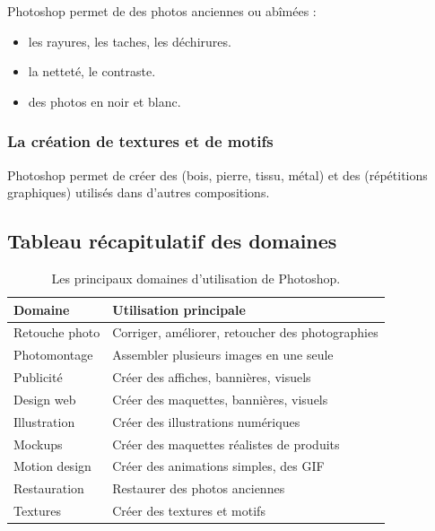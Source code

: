 Photoshop permet de  des photos anciennes ou abîmées :

\begin{itemize}
    \item {} les rayures, les taches, les déchirures.
    \item {} la netteté, le contraste.
    \item {} des photos en noir et blanc.
\end{itemize}

\subsubsection{La création de textures et de motifs}

Photoshop permet de créer des  (bois, pierre, tissu, métal) et des  (répétitions graphiques) utilisés dans d'autres compositions.

\subsection{Tableau récapitulatif des domaines}

\begin{table}[h!]
\centering
\begin{tabular}{@{}p{4cm}p{10cm}@{}}
\toprule
\textbf{Domaine} & \textbf{Utilisation principale} \\
\midrule
Retouche photo & Corriger, améliorer, retoucher des photographies \\
Photomontage & Assembler plusieurs images en une seule \\
Publicité & Créer des affiches, bannières, visuels \\
Design web & Créer des maquettes, bannières, visuels \\
Illustration & Créer des illustrations numériques \\
Mockups & Créer des maquettes réalistes de produits \\
Motion design & Créer des animations simples, des GIF \\
Restauration & Restaurer des photos anciennes \\
Textures & Créer des textures et motifs \\
\bottomrule
\end{tabular}
\caption{Les principaux domaines d'utilisation de Photoshop.}
\end{table}

